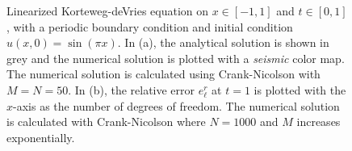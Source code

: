 \begin{figure}
\centering
{}\hspace{0mm}
\hspace{0mm}
\caption{Linearized Korteweg-deVries equation on $x \in [-1,1]$ and $t \in [0,1]$, with a periodic boundary condition and initial condition $u(x,0)=\sin{(\pi x)}$. In (a), the analytical solution is shown in grey and the numerical solution is plotted with a \textit{seismic} color map. The numerical solution is calculated using Crank-Nicolson with $M=N=50$. In (b), the relative error $e^r_{\ell}$ at $t=1$ is plotted with the $x$-axis as the number of degrees of freedom. The numerical solution is calculated with Crank-Nicolson where $N=1000$ and $M$ increases exponentially.}
\end{figure}

